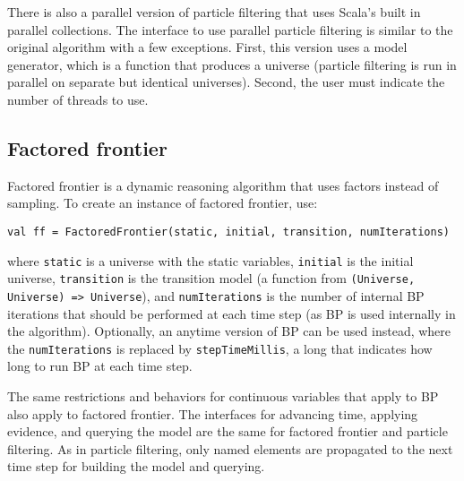 There is also a parallel version of particle filtering that uses Scala's built in parallel collections. The interface to use parallel particle filtering is similar to the original algorithm with a few exceptions. First, this version uses a model generator, which is a function that produces a universe (particle filtering is run in parallel on separate but identical universes). Second, the user must indicate the number of threads to use. 

\subsection{Factored frontier}

Factored frontier is a dynamic reasoning algorithm that uses factors instead of sampling. To create an instance of factored frontier, use:

\begin{flushleft}
\texttt{val ff = FactoredFrontier(static, initial, transition, numIterations)}
\end{flushleft}

where \texttt{static} is a universe with the static variables, \texttt{initial} is the initial universe, \texttt{transition} is the transition model (a function from \texttt{(Universe, Universe) => Universe}), and \texttt{numIterations} is the number of internal BP iterations that should be performed at each time step (as BP is used internally in the algorithm). Optionally, an anytime version of BP can be used instead, where the \texttt{numIterations} is replaced by \texttt{stepTimeMillis}, a long that indicates how long to run BP at each time step.

The same restrictions and behaviors for continuous variables that apply to BP also apply to factored frontier. The interfaces for advancing time, applying evidence, and querying the model are the same for factored frontier and particle filtering. As in particle filtering, only named elements are propagated to the next time step for building the model and querying.

